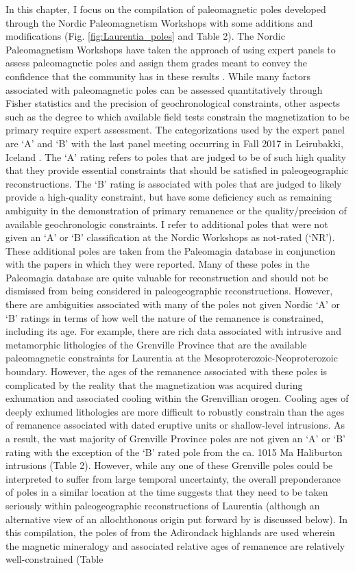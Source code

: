 \documentclass[twocolumn, switch]{article} %
\begin{document}
In this chapter, I focus on the compilation of paleomagnetic poles developed through the Nordic Paleomagnetism Workshops with some additions and modifications (Fig. \ref{fig:Laurentia_poles} and Table 2). The Nordic Paleomagnetism Workshops have taken the approach of using expert panels to assess paleomagnetic poles and assign them grades meant to convey the confidence that the community has in these results \citep{Evans2021a}. While many factors associated with paleomagnetic poles can be assessed quantitatively through Fisher statistics and the precision of geochronological constraints, other aspects such as the degree to which available field tests constrain the magnetization to be primary require expert assessment. The categorizations used by the expert panel are `A' and `B' with the last panel meeting occurring in Fall 2017 in Leirubakki, Iceland \citep{Brown2018a}. The `A' rating refers to poles that are judged to be of such high quality that they provide essential constraints that should be satisfied in paleogeographic reconstructions. The `B' rating is associated with poles that are judged to likely provide a high-quality constraint, but have some deficiency such as remaining ambiguity in the demonstration of primary remanence or the quality/precision of available geochronologic constraints. I refer to additional poles that were not given an `A' or `B' classification at the Nordic Workshops as not-rated (`NR'). These additional poles are taken from the Paleomagia database \citep{Veikkolainen2014a} in conjunction with the papers in which they were reported. Many of these poles in the Paleomagia database are quite valuable for reconstruction and should not be dismissed from being considered in paleogeographic reconstructions. However, there are ambiguities associated with many of the poles not given Nordic `A' or `B' ratings in terms of how well the nature of the remanence is constrained, including its age. For example, there are rich data associated with intrusive and metamorphic lithologies of the Grenville Province that are the available paleomagnetic constraints for Laurentia at the Mesoproterozoic-Neoproterozoic boundary. However, the ages of the remanence associated with these poles is complicated by the reality that the magnetization was acquired during exhumation and associated cooling within the Grenvillian orogen. Cooling ages of deeply exhumed lithologies are more difficult to robustly constrain than the ages of remanence associated with dated eruptive units or shallow-level intrusions. As a result, the vast majority of Grenville Province poles are not given an `A' or `B' rating with the exception of the `B' rated pole from the ca. 1015 Ma Haliburton intrusions (Table 2). However, while any one of these Grenville poles could be interpreted to suffer from large temporal uncertainty, the overall preponderance of poles in a similar location at the time suggests that they need to be taken seriously within paleogeographic reconstructions of Laurentia (although an alternative view of an allochthonous origin put forward by \citealp{Halls2015a} is discussed below). In this compilation, the poles of \cite{Brown2012a} from the Adirondack highlands are used wherein the magnetic mineralogy and associated relative ages of remanence are relatively well-constrained (Table 
\end{document}
